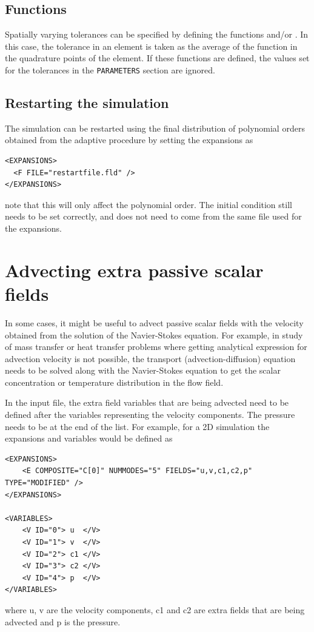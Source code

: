 \subsection{Functions}

Spatially varying tolerances can be specified by defining the
functions  and/or
. In this case, the tolerance in an
element is taken as the average of the function in the quadrature
points of the element. If these functions are defined, the values set
for the tolerances in the \texttt{PARAMETERS} section are ignored.

\subsection{Restarting the simulation}

The simulation can be restarted using the final distribution of
polynomial orders obtained from the adaptive procedure by setting
the expansions as
\begin{lstlisting}[style=XMLStyle]
<EXPANSIONS>
  <F FILE="restartfile.fld" />
</EXPANSIONS>
\end{lstlisting}
note that this will only affect the polynomial order. The initial condition
still needs to be set correctly, and does not need to come from the same file
used for the expansions.

\section{Advecting extra passive scalar fields}

In some cases, it might be useful to advect passive scalar fields with the velocity obtained from the
solution of the Navier-Stokes equation. For example, in study of mass transfer or heat transfer problems
where getting analytical expression for advection velocity is not possible, the transport (advection-diffusion)
equation needs to be solved along with the Navier-Stokes equation to get the scalar concentration or
temperature distribution in the flow field.

In the input file, the extra field variables that are being advected need to be defined after the variables
representing the velocity components. The pressure needs to be at the end of the list. For example, for
a 2D simulation the expansions and variables would be defined as

\begin{lstlisting}[style=XMLStyle]
<EXPANSIONS>
    <E COMPOSITE="C[0]" NUMMODES="5" FIELDS="u,v,c1,c2,p" TYPE="MODIFIED" />
</EXPANSIONS>

<VARIABLES>
    <V ID="0"> u  </V>
    <V ID="1"> v  </V>
    <V ID="2"> c1 </V>
    <V ID="3"> c2 </V>
    <V ID="4"> p  </V>
</VARIABLES>
\end{lstlisting}
where u, v are the velocity components, c1 and c2 are extra fields that are being advected and p is the pressure.

